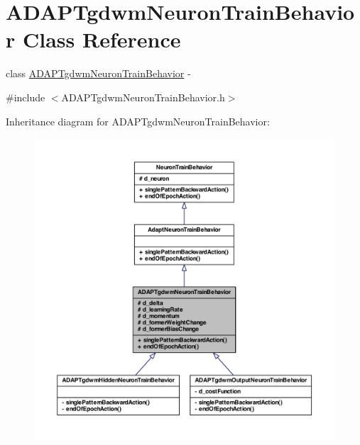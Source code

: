 \hypertarget{class_a_d_a_p_tgdwm_neuron_train_behavior}{
\section{ADAPTgdwmNeuronTrainBehavior Class Reference}
\label{class_a_d_a_p_tgdwm_neuron_train_behavior}
}


class \hyperlink{class_a_d_a_p_tgdwm_neuron_train_behavior}{ADAPTgdwmNeuronTrainBehavior} -\/  




{\ttfamily \#include $<$ADAPTgdwmNeuronTrainBehavior.h$>$}



Inheritance diagram for ADAPTgdwmNeuronTrainBehavior:
\nopagebreak
\begin{figure}[H]
\begin{center}
\leavevmode
\includegraphics[width=400pt]{class_a_d_a_p_tgdwm_neuron_train_behavior__inherit__graph}
\end{center}
\end{figure}


